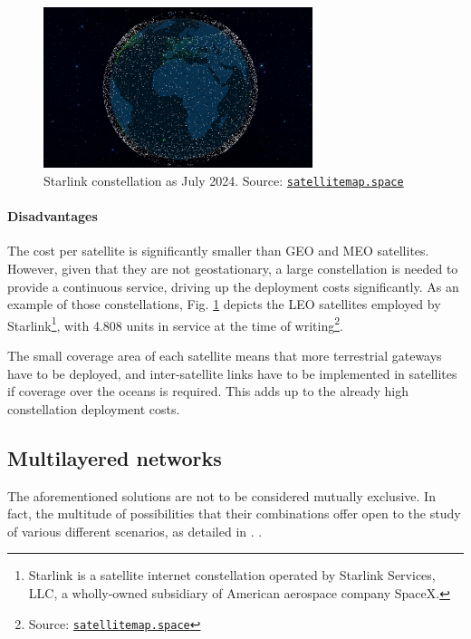 \begin{figure}[ht]
    \centering
    \includegraphics[width=0.7\textwidth]{res/starlink-constellation.png}
    \caption{Starlink constellation as July 2024. Source: \href{https://satellitemap.space/}{\texttt{satellitemap.space}}}
    \label{fig:starlink_constellation}
\end{figure}

\paragraph{Disadvantages}
The cost per satellite is significantly smaller than \ac{GEO} and \ac{MEO} satellites. However, given that they are not geostationary, a large constellation is needed to provide a continuous service, driving up the deployment costs significantly. As an example of those constellations, Fig. \ref{fig:starlink_constellation} depicts the \ac{LEO} satellites employed by Starlink\footnote{Starlink is a satellite internet constellation operated by Starlink Services, LLC, a wholly-owned subsidiary of American aerospace company SpaceX.}, with 4.808 units in service at the time of writing\footnote{Source: \href{https://satellitemap.space/}{\texttt{satellitemap.space}}}.

The small coverage area of each satellite means that more terrestrial gateways have to be deployed, and inter-satellite links have to be implemented in satellites if coverage over the oceans is required. This adds up to the already high constellation deployment costs.

\subsection{Multilayered networks}
The aforementioned solutions are not to be considered mutually exclusive. In fact, the multitude of possibilities that their combinations offer open to the study of various different scenarios, as detailed in \cite{potential-multilayered-nierarchical-ntn-wang}.
.

